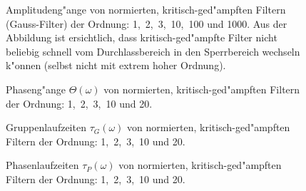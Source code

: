 \begin{figure}[!htb]
\vspace*{-7mm}
\begin{center}
  \vspace*{-3mm}\caption{Amplitudeng"ange von normierten, kritisch-ged"ampften Filtern (Gauss-Filter) der Ordnung: 1,~2,~3,~10,~100 und 1000. Aus der Abbildung ist ersichtlich, dass kritisch-ged"ampfte Filter nicht beliebig schnell vom Durchlassbereich in den Sperrbereich wechseln k"onnen (selbst nicht mit extrem hoher Ordnung).}
\end{center}
\vspace*{-6mm} 
\end{figure}

\begin{figure}[!htb]
\vspace*{-7mm}
\begin{center}
  \vspace*{-3mm}\caption{Phaseng"ange $\Theta(\omega)$ von normierten, kritisch-ged"ampften Filtern der Ordnung: 1,~2,~3,~10 und 20.}
\end{center}
\vspace*{-6mm} 
\end{figure}


\begin{figure}[!htb]
\vspace*{-7mm}
\begin{center}
  \vspace*{-3mm}\caption{Gruppenlaufzeiten $\tau_G(\omega)$ von normierten, kritisch-ged"ampften Filtern der Ordnung: 1,~2,~3,~10 und 20.}
\end{center}
\vspace*{-6mm} 

\end{figure}
\begin{figure}[!htb]
\vspace*{-7mm}
\begin{center}
  \vspace*{-3mm}\caption{Phasenlaufzeiten $\tau_P(\omega)$ von normierten, kritisch-ged"ampften Filtern der Ordnung: 1,~2,~3,~10 und 20.}
\end{center}
\vspace*{-6mm} 
\end{figure}




